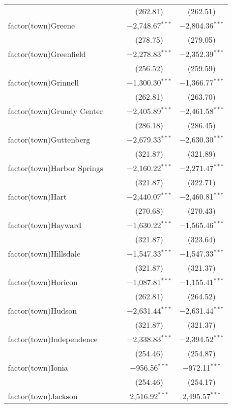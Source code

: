 \begin{table}[!htbp]
\begin{tabular}{@{\extracolsep{5pt}}lcccc}
  &  &  & (262.81) & (262.51) \\ 
  factor(town)Greene &  &  & $-$2,748.67$^{***}$ & $-$2,804.36$^{***}$ \\ 
  &  &  & (278.75) & (279.05) \\ 
  factor(town)Greenfield &  &  & $-$2,278.83$^{***}$ & $-$2,352.39$^{***}$ \\ 
  &  &  & (256.52) & (259.59) \\ 
  factor(town)Grinnell &  &  & $-$1,300.30$^{***}$ & $-$1,366.77$^{***}$ \\ 
  &  &  & (262.81) & (263.70) \\ 
  factor(town)Grundy Center &  &  & $-$2,405.89$^{***}$ & $-$2,461.58$^{***}$ \\ 
  &  &  & (286.18) & (286.45) \\ 
  factor(town)Guttenberg &  &  & $-$2,679.33$^{***}$ & $-$2,630.30$^{***}$ \\ 
  &  &  & (321.87) & (321.89) \\ 
  factor(town)Harbor Springs &  &  & $-$2,160.22$^{***}$ & $-$2,271.47$^{***}$ \\ 
  &  &  & (321.87) & (322.71) \\ 
  factor(town)Hart &  &  & $-$2,440.07$^{***}$ & $-$2,460.81$^{***}$ \\ 
  &  &  & (270.68) & (270.43) \\ 
  factor(town)Hayward &  &  & $-$1,630.22$^{***}$ & $-$1,565.46$^{***}$ \\ 
  &  &  & (321.87) & (323.64) \\ 
  factor(town)Hillsdale &  &  & $-$1,547.33$^{***}$ & $-$1,547.33$^{***}$ \\ 
  &  &  & (321.87) & (321.37) \\ 
  factor(town)Horicon &  &  & $-$1,087.81$^{***}$ & $-$1,155.41$^{***}$ \\ 
  &  &  & (262.81) & (264.52) \\ 
  factor(town)Hudson &  &  & $-$2,631.44$^{***}$ & $-$2,631.44$^{***}$ \\ 
  &  &  & (321.87) & (321.37) \\ 
  factor(town)Independence &  &  & $-$2,338.83$^{***}$ & $-$2,394.52$^{***}$ \\ 
  &  &  & (254.46) & (254.87) \\ 
  factor(town)Ionia &  &  & $-$956.56$^{***}$ & $-$972.11$^{***}$ \\ 
  &  &  & (254.46) & (254.17) \\ 
  factor(town)Jackson &  &  & 2,516.92$^{***}$ & 2,495.57$^{***}$ \\ 

\end{tabular}
\end{table}
